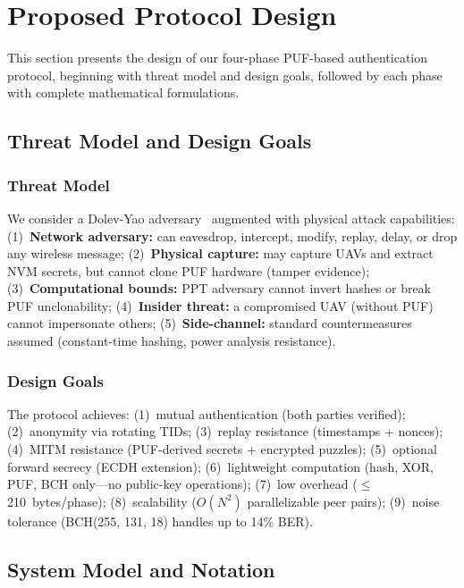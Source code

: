 \documentclass[11pt,a4paper]{article}
\begin{document}
\section{Proposed Protocol Design}
\label{sec:protocol}

This section presents the design of our four-phase PUF-based authentication protocol, beginning with threat model and design goals, followed by each phase with complete mathematical formulations.

\subsection{Threat Model and Design Goals}

\subsubsection{Threat Model}

We consider a Dolev-Yao adversary~\cite{dolev_yao} augmented with physical attack capabilities: (1)~\textbf{Network adversary:} can eavesdrop, intercept, modify, replay, delay, or drop any wireless message; (2)~\textbf{Physical capture:} may capture UAVs and extract NVM secrets, but cannot clone PUF hardware (tamper evidence); (3)~\textbf{Computational bounds:} PPT adversary cannot invert hashes or break PUF unclonability; (4)~\textbf{Insider threat:} a compromised UAV (without PUF) cannot impersonate others; (5)~\textbf{Side-channel:} standard countermeasures assumed (constant-time hashing, power analysis resistance).

\subsubsection{Design Goals}

The protocol achieves: (1)~mutual authentication (both parties verified); (2)~anonymity via rotating TIDs; (3)~replay resistance (timestamps + nonces); (4)~MITM resistance (PUF-derived secrets + encrypted puzzles); (5)~optional forward secrecy (ECDH extension); (6)~lightweight computation (hash, XOR, PUF, BCH only---no public-key operations); (7)~low overhead ($\leq$210~bytes/phase); (8)~scalability ($O(N^2)$ parallelizable peer pairs); (9)~noise tolerance (BCH(255, 131, 18) handles up to 14\% BER).

\subsection{System Model and Notation}
\end{document}

